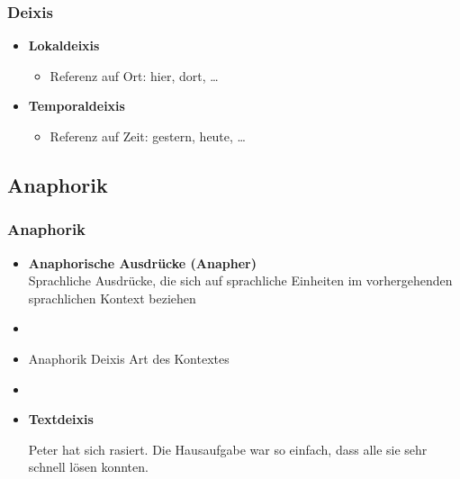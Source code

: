 \begin{frame}
\frametitle{Deixis}

\begin{itemize}
	\item \textbf{Lokaldeixis}
	
	\begin{itemize}
		\item Referenz auf Ort: hier, dort, \dots
	\end{itemize}
	
	\item \textbf{Temporaldeixis}
	
	\begin{itemize}
		\item Referenz auf Zeit: gestern, heute, \dots
	\end{itemize}
	
\end{itemize}

\end{frame}


%
\subsection{Anaphorik}
%

\begin{frame}
\frametitle{Anaphorik}

\begin{itemize}
	\item \textbf{Anaphorische Ausdrücke (Anapher)}\\
Sprachliche Ausdrücke, die sich auf sprachliche Einheiten im vorhergehenden sprachlichen Kontext beziehen
	\item[]
	\item Anaphorik \vs Deixis \ras Art des Kontextes
	\item[]	
	\item \textbf{Textdeixis}
	
	\eal 
	\ex Peter hat sich rasiert.
	\ex Die Hausaufgabe war so einfach, dass alle sie sehr schnell lösen konnten.
	\zl
	
\end{itemize}
	
\end{frame}


